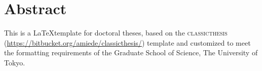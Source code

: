 \begingroup

\chapter*{Abstract}
This is a \LaTeX template for doctoral theses, based on the \textsc{classicthesis} (\url{https://bitbucket.org/amiede/classicthesis/}) template and customized to meet the formatting requirements of the Graduate School of Science, The University of Tokyo.

%

\endgroup
